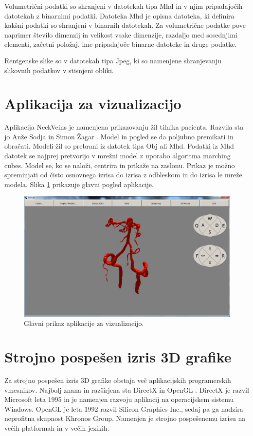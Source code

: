 \documentclass[a4paper, 12pt]{book}
\begin{document}
Volumetrični podatki so shranjeni v datotekah tipa Mhd\cite{mhd} in v njim pripadajočih datotekah z binarnimi podatki. Datoteka Mhd je opisna datoteka, ki definira kakšni podatki so shranjeni v binarnih datotekah. Za volumetrične podatke pove naprimer število dimenzij in velikost vsake dimenzije, razdaljo med sosednjimi elementi, začetni položaj, ime pripadajoče binarne datoteke in druge podatke.

Rentgenske slike so v datotekah tipa Jpeg, ki so namenjene shranjevanju slikovnih podatkov v stisnjeni obliki.

\section{Aplikacija za vizualizacijo}

Aplikacija NeckVeins je namenjena prikazovanju žil tilnika pacienta. Razvila sta jo Anže Sodja \cite{sodja} in Simon Žagar \cite{zagar}. Model in pogled se da poljubno premikati in obračati. Modeli žil so prebrani iz datotek tipa Obj ali Mhd. Podatki iz Mhd datotek se najprej pretvorijo v mrežni model z uporabo algoritma marching cubes.  Model se, ko se naloži, centrira in prikaže na zaslonu. Prikaz je možno spreminjati od čisto osnovnega izrisa do izrisa z odbleskom in do izrisa le mreže modela. Slika \ref{aplikacija} prikazuje glavni pogled aplikacije. 

\begin{figure}[h!]
\begin{center}
\includegraphics[width=13.5cm]{Aplikacija.png}
\end{center}
\caption{Glavni prikaz aplikacije za vizualizacijo.}
\label{aplikacija}
\end{figure}

\section{Strojno pospešen izris 3D grafike}
Za strojno pospešen izris 3D grafike obstaja več aplikacijskih programerskih vmesnikov. Najbolj znana in razširjena sta DirectX \cite{DirectX} in OpenGL \cite{OpenGL}. DirectX je razvil Microsoft leta 1995 in je namenjen razvoju aplikacij na operacijskem sistemu Windows. OpenGL je leta 1992 razvil Silicon Graphics Inc., sedaj pa ga nadzira neprofitna skupnost Khronos Group. Namenjen je strojno pospešenemu izrisu na večih platformah in v večih jezikih. 
\end{document}
